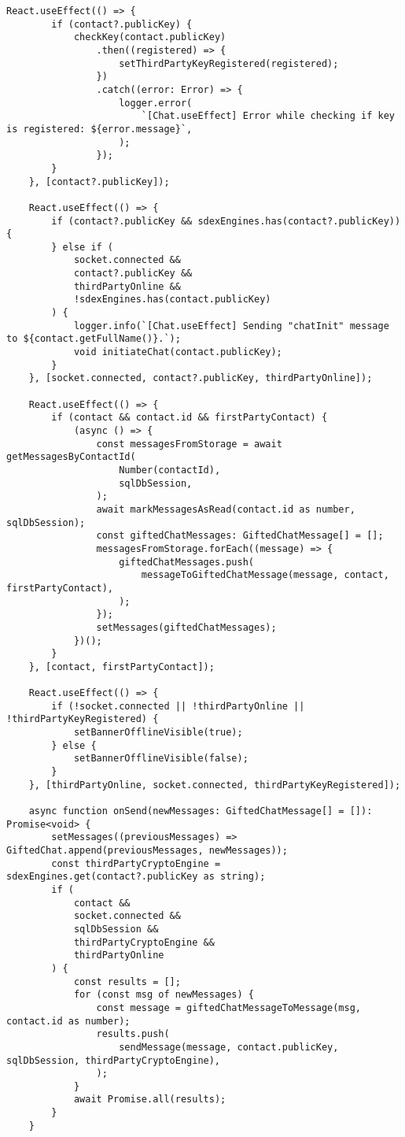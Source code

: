 \documentclass[../main.tex]{subfiles}
\begin{document}
\begin{lstlisting}[caption={Implementacja ekranu czatu},label={lst:js_chat_screen}]
    React.useEffect(() => {
        if (contact?.publicKey) {
            checkKey(contact.publicKey)
                .then((registered) => {
                    setThirdPartyKeyRegistered(registered);
                })
                .catch((error: Error) => {
                    logger.error(
                        `[Chat.useEffect] Error while checking if key is registered: ${error.message}`,
                    );
                });
        }
    }, [contact?.publicKey]);

    React.useEffect(() => {
        if (contact?.publicKey && sdexEngines.has(contact?.publicKey)) {
        } else if (
            socket.connected &&
            contact?.publicKey &&
            thirdPartyOnline &&
            !sdexEngines.has(contact.publicKey)
        ) {
            logger.info(`[Chat.useEffect] Sending "chatInit" message to ${contact.getFullName()}.`);
            void initiateChat(contact.publicKey);
        }
    }, [socket.connected, contact?.publicKey, thirdPartyOnline]);

    React.useEffect(() => {
        if (contact && contact.id && firstPartyContact) {
            (async () => {
                const messagesFromStorage = await getMessagesByContactId(
                    Number(contactId),
                    sqlDbSession,
                );
                await markMessagesAsRead(contact.id as number, sqlDbSession);
                const giftedChatMessages: GiftedChatMessage[] = [];
                messagesFromStorage.forEach((message) => {
                    giftedChatMessages.push(
                        messageToGiftedChatMessage(message, contact, firstPartyContact),
                    );
                });
                setMessages(giftedChatMessages);
            })();
        }
    }, [contact, firstPartyContact]);

    React.useEffect(() => {
        if (!socket.connected || !thirdPartyOnline || !thirdPartyKeyRegistered) {
            setBannerOfflineVisible(true);
        } else {
            setBannerOfflineVisible(false);
        }
    }, [thirdPartyOnline, socket.connected, thirdPartyKeyRegistered]);

    async function onSend(newMessages: GiftedChatMessage[] = []): Promise<void> {
        setMessages((previousMessages) => GiftedChat.append(previousMessages, newMessages));
        const thirdPartyCryptoEngine = sdexEngines.get(contact?.publicKey as string);
        if (
            contact &&
            socket.connected &&
            sqlDbSession &&
            thirdPartyCryptoEngine &&
            thirdPartyOnline
        ) {
            const results = [];
            for (const msg of newMessages) {
                const message = giftedChatMessageToMessage(msg, contact.id as number);
                results.push(
                    sendMessage(message, contact.publicKey, sqlDbSession, thirdPartyCryptoEngine),
                );
            }
            await Promise.all(results);
        }
    }


\end{lstlisting}
\end{document}
